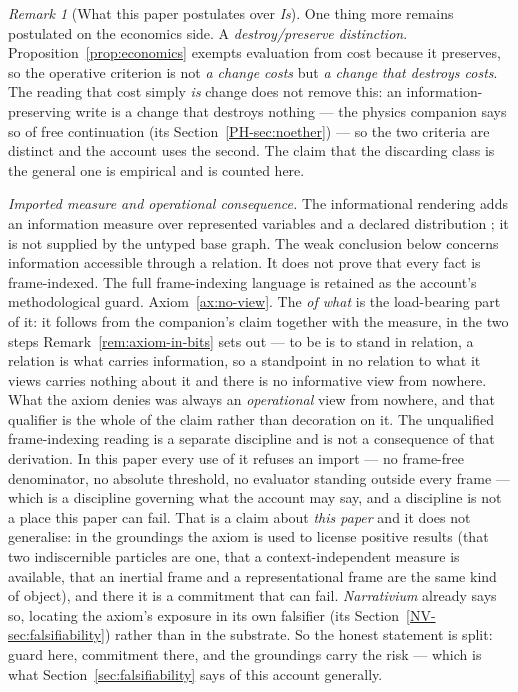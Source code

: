 \documentclass[11pt,a4paper]{article}
\theoremstyle{remark}\newtheorem{remark}[definition]{Remark}
\begin{document}
\begin{remark}[What this paper postulates over \emph{Is}]
One thing more remains postulated on the economics side.
A \emph{destroy\slash preserve distinction}. Proposition~\ref{prop:economics} exempts evaluation from
cost because it preserves, so the operative criterion is not \emph{a change costs} but \emph{a change
that destroys costs}. The reading that cost simply \emph{is} change does not remove this: an
information-preserving write is a change that destroys nothing --- the physics companion says so of
free continuation (its Section~\ref{PH-sec:noether}) --- so the two criteria are distinct and the account uses the second. The claim that
the discarding class is the general one is empirical and is counted here.

\emph{Imported measure and operational consequence.} The informational rendering adds an information measure over represented variables and a declared distribution \citep{shannon1948}; it is not supplied by the untyped base graph. The weak conclusion below concerns information accessible through a relation. It does not prove that every fact is frame-indexed. The full frame-indexing language is retained as the account's methodological guard.  Axiom~\ref{ax:no-view}. The \emph{of what} is the
load-bearing part of it: it follows from the
companion's claim together with the measure, in the two steps Remark~\ref{rem:axiom-in-bits} sets out
--- to be is to stand in relation, a relation is what carries information, so a standpoint in no
relation to what it views carries nothing about it and there is no informative view from nowhere. What
the axiom denies was always an \emph{operational} view from nowhere, and that qualifier is the whole of
the claim rather than decoration on it. The unqualified frame-indexing reading is a separate discipline and is not a consequence of that derivation. In this paper every use of it refuses
an import --- no frame-free denominator, no absolute threshold, no evaluator standing outside every
frame --- which is a discipline governing what the account may say, and a discipline is not a place
this paper can fail. That is a claim about \emph{this paper} and it does not generalise: in the
groundings the axiom is used to license positive results (that two indiscernible particles are one,
that a context-independent measure is available, that an inertial frame and a representational frame
are the same kind of object), and there it is a commitment that can fail. \emph{Narrativium}
already says so, locating the axiom's exposure in its own falsifier (its Section~\ref{NV-sec:falsifiability}) rather than in the substrate. So
the honest statement is split: guard here, commitment there, and the groundings carry the risk --- which
is what Section~\ref{sec:falsifiability} says of this account generally.


\end{remark}
\end{document}
